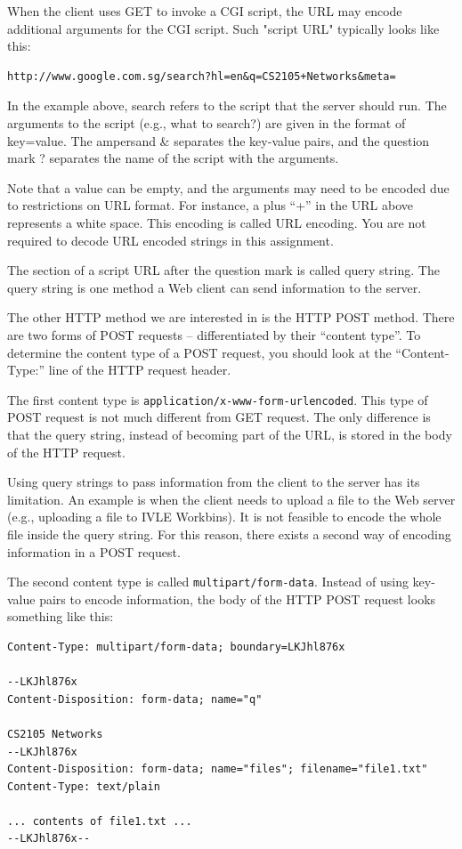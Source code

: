 \documentclass[a4paper,11pt]{exam}
\begin{document}
    When the client uses GET to invoke a CGI script, the URL may encode additional arguments for the CGI script. Such "script URL" typically looks like this:

\begin{verbatim}
http://www.google.com.sg/search?hl=en&q=CS2105+Networks&meta=
\end{verbatim}

    In the example above, search refers to the script that the server should run. The arguments to the script (e.g., what to search?) are given in the format of key=value. The ampersand \& separates the key-value pairs, and the question mark ? separates the name of the script with the arguments.

    Note that a value can be empty, and the arguments may need to be encoded due to restrictions on URL format. For instance, a plus ``+'' in the URL above represents a white space. This encoding is called URL encoding. You are not required to decode URL encoded strings in this assignment.

    The section of a script URL after the question mark is called query string. The query string is one method a Web client can send information to the server.

    The other HTTP method we are interested in is the HTTP POST method. There are two forms of POST requests -- differentiated by their ``content type''. To determine the content type of a POST request, you should look at the ``Content-Type:'' line of the HTTP request header.

    The first content type is \texttt{application/x-www-form-urlencoded}. This type of POST request is not much different from GET request. The only difference is that the query string, instead of becoming part of the URL, is stored in the body of the HTTP request.

    Using query strings to pass information from the client to the server has its limitation. An example is when the client needs to upload a file to the Web server (e.g., uploading a file to IVLE Workbins). It is not feasible to encode the whole file inside the query string. For this reason, there exists a second way of encoding information in a POST request.

    The second content type is called \texttt{multipart/form-data}. Instead of using key-value pairs to encode information, the body of the HTTP POST request looks something like this:

    \begin{verbatim}
Content-Type: multipart/form-data; boundary=LKJhl876x

--LKJhl876x
Content-Disposition: form-data; name="q"

CS2105 Networks
--LKJhl876x
Content-Disposition: form-data; name="files"; filename="file1.txt"
Content-Type: text/plain

... contents of file1.txt ...
--LKJhl876x--

\end{verbatim}
\end{document}
